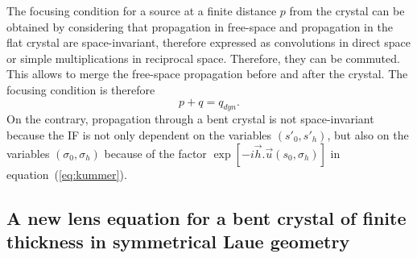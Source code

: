 \documentclass[preprint]{iucr}              %
\newcommand{\inred}[1]{{\color{red}#1}}
\begin{document}

\inred{
The focusing condition for a source at a finite distance $p$ from the crystal can be obtained by considering that propagation in free-space and propagation in the flat crystal are space-invariant, therefore expressed as convolutions in direct space or simple multiplications in reciprocal space. Therefore, they can be commuted. This allows to merge the free-space propagation before and after the crystal. The focusing condition is therefore
\begin{equation}
    p + q = q_{dyn}.
\end{equation}
On the contrary, propagation through a bent crystal is not space-invariant because the IF is not only dependent on the variables $(s'_0, s'_h)$, but also on the variables $(\sigma_0, \sigma_h)$ because of the factor  
$\exp[-i \vec h . \vec u (s_0, \sigma_h)]$ in 
equation~(\ref{eq:kummer}). 
}


\subsection{\inred{A new} lens equation for a bent crystal of finite thickness in symmetrical Laue geometry}
\label{sec:LaueNewCLE}

\end{document}
